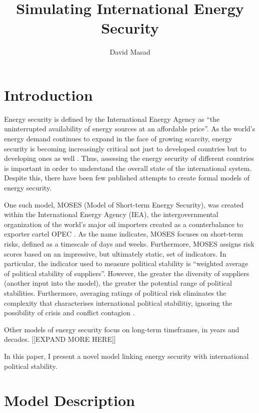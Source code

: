 \documentclass{article}
\begin{document}
\title{Simulating International Energy Security}
	\author{David Masad}
	\maketitle

\section{Introduction}

Energy security is defined by the International Energy Agency as ``the uninterrupted availability of energy sources at an affordable price''\citep{iea_2013}. As the world's energy demand continues to expand in the face of growing scarcity, energy security is becoming increasingly critical not just to developed countries but to developing ones as well \citep{yergin_2006}. Thus, assessing the energy security of different countries is important in order to understand the overall state of the international system. Despite this, there have been few published attempts to create formal models of energy security. 

One such model, MOSES (Model of Short-term Energy Security), was created within the International Energy Agency (IEA), the intergovernmental organization of the world's major oil importers created as a counterbalance to exporter cartel OPEC \citep{}. As the name indicates, MOSES focuses on short-term risks, defined as a timescale of days and weeks. Furthermore, MOSES assigns risk scores based on an impressive, but ultimately static, set of indicators. In particular, the indicator used to measure political stability is ``weighted average of political stability of suppliers''. However, the greater the diversity of suppliers (another input into the model), the greater the potential range of political stabilities. Furthermore, averaging ratings of political risk eliminates the complexity that characterises international political stabilitiy, ignoring the possibility of crisis and conflict contagion \citep{}. 

Other models of energy security focus on long-term timeframes, in years and decades. [[EXPAND MORE HERE]]

In this paper, I present a novel model linking energy security with international political stability.

\section{Model Description}
\end{document}

